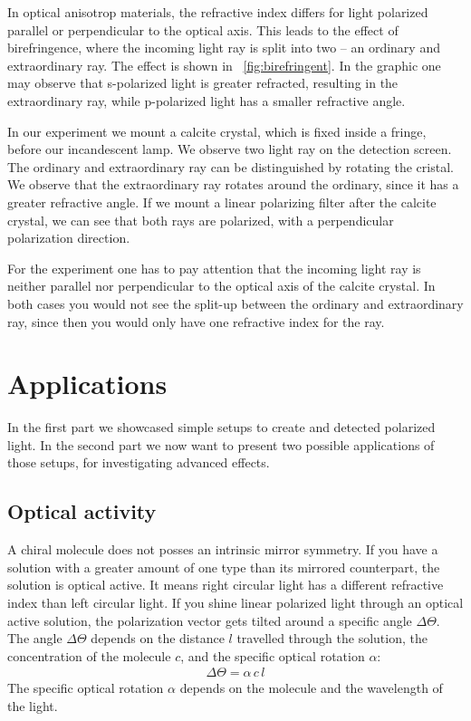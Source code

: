 \documentclass[a4paper,10pt,twocolumn]{article}
\begin{document}
    In optical anisotrop materials, the refractive index differs for light polarized
    parallel or perpendicular to the optical axis.
    This leads to the effect of birefringence, where the incoming light ray is split into 
    two -- an ordinary and extraordinary ray.
    The effect is shown in ~\autoref{fig:birefringent}.
    In the graphic one may observe that s-polarized light is greater refracted,
    resulting in the extraordinary ray,
    while p-polarized light has a smaller refractive angle.
    
    In our experiment we mount a calcite crystal, which is fixed inside a fringe,
    before our incandescent lamp. 
    We observe two light ray on the detection screen.
    The ordinary and extraordinary ray can be distinguished by rotating the cristal.
    We observe that the extraordinary ray rotates around the ordinary, since it has a 
    greater refractive angle.
    If we mount a linear polarizing filter after the calcite crystal, we can see that both rays are
    polarized, with a perpendicular polarization direction.
    
    For the experiment one has to pay attention that the incoming light ray is neither parallel nor
    perpendicular to the optical axis of the calcite crystal. 
    In both cases you would not see the split-up between the ordinary and extraordinary ray,
    since then you would only have one refractive index for the ray.
    
    \section{Applications}
    In the first part we showcased simple setups to create and detected polarized light.
    In the second part we now want to present two possible applications of those setups,
    for investigating advanced effects.
    \subsection{Optical activity}
    A chiral molecule does not posses an intrinsic mirror symmetry.
    If you have a solution with a greater amount of one type than its mirrored counterpart,
    the solution is optical active.
    It means right circular light has a different refractive index than left circular light.
    If you shine linear polarized light through an optical active solution, the
    polarization vector gets tilted around a specific angle $\Delta \Theta$.
    The angle $\Delta \Theta$ depends on the distance $l$ travelled through the solution,
    the concentration of the molecule $c$, and the specific optical rotation $\alpha$:
    \begin{align}
        \label{eq:specificOpticalRotation}
        \Delta \Theta = \alpha \, c \, l
    \end{align}
    The specific optical rotation $\alpha$ depends on the molecule and the wavelength of the light.
    
\end{document}
